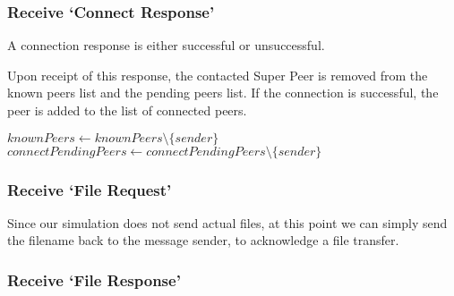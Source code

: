 \subsubsection{Receive `Connect Response'}

A connection response is either successful or unsuccessful.

Upon receipt of this response, the contacted Super Peer is removed from the
known peers list and the pending peers list. If the connection is successful,
the peer is added to the list of connected peers.

\begin{algorithm}[H]

  $knownPeers \leftarrow knownPeers \setminus \{sender\}$\;
  $connectPendingPeers \leftarrow connectPendingPeers \setminus \{sender\}$\;
\end{algorithm}

\subsubsection{Receive `File Request'}

Since our simulation does not send actual files, at this point we can simply
send the filename back to the message sender, to acknowledge a file transfer.

\begin{algorithm}[H]

  \;
\end{algorithm}

\subsubsection{Receive `File Response'}

